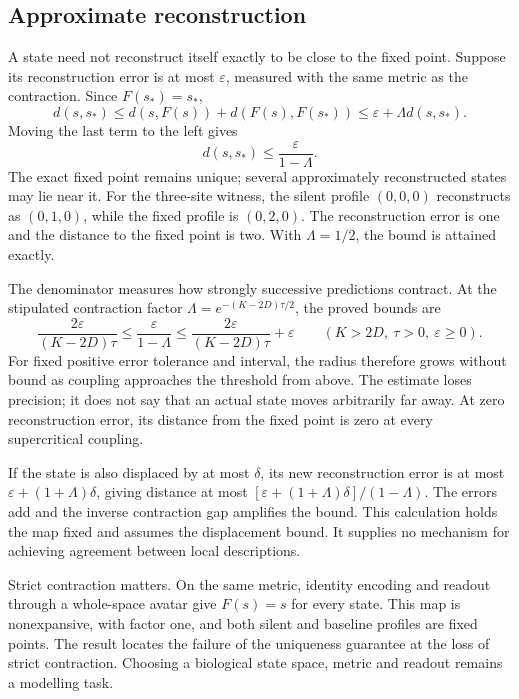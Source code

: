 \documentclass[11pt]{article}
\begin{document}
\subsection{Approximate reconstruction}

A state need not reconstruct itself exactly to be close to the fixed point.
Suppose its reconstruction error is at most $\varepsilon$, measured with the
same metric as the contraction. Since $F(s_*)=s_*$,
\[
d(s,s_*)\leq d(s,F(s))+d(F(s),F(s_*))
\leq\varepsilon+\Lambda d(s,s_*).
\]
Moving the last term to the left gives
\[
d(s,s_*)\leq\frac{\varepsilon}{1-\Lambda}.
\]
The exact fixed point remains unique; several approximately reconstructed
states may lie near it. For the three-site witness, the silent profile
$(0,0,0)$ reconstructs as $(0,1,0)$, while the fixed profile is $(0,2,0)$.
The reconstruction error is one and the distance to the fixed point is two.
With $\Lambda=1/2$, the bound is attained exactly.

The denominator measures how strongly successive predictions contract.
At the stipulated contraction factor $\Lambda=e^{-(K-2D)\tau/2}$, the proved bounds are
\[
\frac{2\varepsilon}{(K-2D)\tau}
\leq\frac{\varepsilon}{1-\Lambda}
\leq\frac{2\varepsilon}{(K-2D)\tau}+\varepsilon
\qquad(K>2D,\ \tau>0,\ \varepsilon\geq0).
\]
For fixed positive error tolerance and interval, the radius therefore grows
without bound as coupling approaches the threshold from above. The estimate
loses precision; it does not say that an actual state moves arbitrarily far
away. At zero reconstruction error, its distance from the fixed point is zero
at every supercritical coupling.

If the state is also displaced by at most $\delta$, its new reconstruction
error is at most $\varepsilon+(1+\Lambda)\delta$, giving distance at most
$[\varepsilon+(1+\Lambda)\delta]/(1-\Lambda)$. The errors add and the inverse
contraction gap amplifies the bound. This calculation holds the map fixed and
assumes the displacement bound. It supplies no mechanism for achieving
agreement between local descriptions.

Strict contraction matters. On the same metric, identity encoding and readout
through a whole-space avatar give $F(s)=s$ for every state. This map is
nonexpansive, with factor one, and both silent and baseline profiles are fixed
points. The result locates the failure of the uniqueness guarantee at the
loss of strict contraction. Choosing a biological state space, metric and
readout remains a modelling task.
\end{document}
